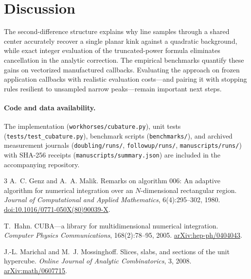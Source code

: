 \documentclass[10pt,letterpaper]{article}
\begin{document}
\section{Discussion}

The second-difference structure explains why line samples through a shared center accurately recover a single planar kink against a quadratic background, while exact integer evaluation of the truncated-power formula eliminates cancellation in the analytic correction. The empirical benchmarks quantify these gains on vectorized manufactured callbacks. Evaluating the approach on frozen application callbacks with realistic evaluation costs---and pairing it with stopping rules resilient to unsampled narrow peaks---remain important next steps.

\paragraph{Code and data availability.}
The implementation (\nolinkurl{workhorses/cubature.py}), unit tests (\nolinkurl{tests/test_cubature.py}), benchmark scripts (\nolinkurl{benchmarks/}), and archived measurement journals (\nolinkurl{doubling/runs/}, \nolinkurl{followup/runs/}, \nolinkurl{manuscripts/runs/}) with SHA-256 receipts (\nolinkurl{manuscripts/summary.json}) are included in the accompanying repository.

\begin{thebibliography}{3}
A.~C. Genz and A.~A. Malik.
\newblock Remarks on algorithm 006: An adaptive algorithm for numerical integration over an $N$-dimensional rectangular region.
\newblock \emph{Journal of Computational and Applied Mathematics}, 6(4):295--302, 1980.
\newblock \href{https://doi.org/10.1016/0771-050X(80)90039-X}{doi:10.1016/0771-050X(80)90039-X}.

T.~Hahn.
\newblock CUBA---a library for multidimensional numerical integration.
\newblock \emph{Computer Physics Communications}, 168(2):78--95, 2005.
\newblock \href{https://arxiv.org/abs/hep-ph/0404043}{arXiv:hep-ph/0404043}.

J.-L. Marichal and M.~J. Mossinghoff.
\newblock Slices, slabs, and sections of the unit hypercube.
\newblock \emph{Online Journal of Analytic Combinatorics}, 3, 2008.
\newblock \href{https://arxiv.org/abs/math/0607715}{arXiv:math/0607715}.
\end{thebibliography}
\end{document}
